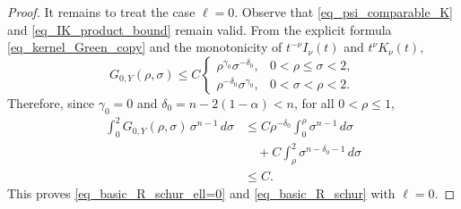 \documentclass[10pt,a4paper]{amsart}
\begin{document}
\begin{proof}
It remains to treat the case $\ell=0$. Observe that \eqref{eq_psi_comparable_K} and \eqref{eq_IK_product_bound} remain valid. From the explicit formula \eqref{eq_kernel_Green_copy} and the monotonicity of $t^{-\nu}I_{\nu}(t)$ and $t^\nu K_\nu(t)$,
\begin{equation*}
    G_{0,Y}(\rho,\sigma) \le C \begin{cases}
        \rho^{\gamma_0} \sigma^{-\delta_0}, & 0<\rho \le \sigma <2,\\[4pt]
        \rho^{-\delta_0} \sigma^{\gamma_0}, & 0<\sigma <\rho<2.
    \end{cases}
\end{equation*}
Therefore, since $\gamma_0 = 0$ and $\delta_0 = n-2(1-\alpha) <n$, for all $0<\rho \le 1$,
\begin{align*}
    \int_0^2 G_{0,Y}(\rho,\sigma)\,\sigma^{n-1}\,d\sigma
    &\le C \rho^{-\delta_0} \int_0^\rho \sigma^{n-1}\,d\sigma\\
    &\quad+ C \int_\rho^2 \sigma^{n-\delta_0 -1}\,d\sigma \\
    &\le C.
\end{align*}
This proves \eqref{eq_basic_R_schur_ell=0} and \eqref{eq_basic_R_schur} with $\ell=0$.





\end{proof}
\end{document}
